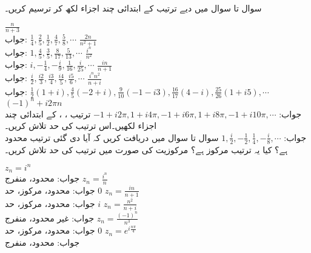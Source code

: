 سوال  تا سوال  میں دیے ترتیب کے ابتدائی چند اجزاء لکھ کر ترسیم کریں۔

\quad
$\tfrac{n}{n+3}$\\
جواب:\quad
$\tfrac{1}{4},\tfrac{2}{5},\tfrac{1}{2},\tfrac{4}{7},\tfrac{5}{8},\cdots$
\quad
$\tfrac{2n}{n^2+1}$\\
جواب:\quad
$1,\tfrac{4}{5},\tfrac{3}{5},\tfrac{8}{17},\tfrac{5}{13},\cdots$
\quad
$\tfrac{i^n}{n^2}$\\
جواب:\quad
$i,-\tfrac{1}{4},-\tfrac{i}{9},\tfrac{1}{16},\tfrac{i}{25},\cdots$
\quad
$\tfrac{in}{n+1}$\\
جواب:\quad
$\tfrac{i}{2},\tfrac{i2}{3},\tfrac{i3}{4},\tfrac{i4}{5},\tfrac{i5}{6},\cdots$
\quad
$\tfrac{i^n n^2}{n+i}$\\
جواب:\quad
$\tfrac{1}{2}(1+i),\tfrac{4}{5}(-2+i),\tfrac{9}{10}(-1-i3),\tfrac{16}{17}(4-i),\tfrac{25}{26}(1+i5),\cdots$
\quad
$(-1)^n+i2\pi n$\\
جواب:\quad
$-1+i2\pi, 1+i4\pi,-1+i6\pi, 1+i8\pi, -1+i10\pi,\cdots$
\quad
ترتیب ، ،  کے ابتدائی چند اجزاء لکھیں۔اس ترتیب  کی حد تلاش کریں۔\\
جواب:\quad
$1,\tfrac{i}{2}, -\tfrac{1}{2},\tfrac{1}{4}, -\tfrac{i}{8},\cdots$
سوال  تا سوال  میں دریافت کریں کہ آیا دی گئی ترتیب محدود ہے؟ کیا یہ ترتیب مرکوز ہے؟ مرکوزیت کی صورت میں ترتیب کی حد تلاش کریں۔
  
\quad
$z_n=i^n$\\
جواب:\quad
محدود، منفرج
\quad
$z_n=\tfrac{i^n}{n}$\\
جواب:\quad
محدود، مرکوز، حد $0$
\quad
$z_n=\tfrac{in}{n+1}$\\
جواب:\quad
محدود، مرکوز، حد $i$
\quad
$z_n=\tfrac{n^2}{n+i}$\\
جواب:\quad
غیر محدود، منفرج
\quad
$z_n=\tfrac{(-1)^n}{n^3}$\\
جواب:\quad
محدود، مرکوز، حد $0$
\quad
$z_n=e^{i\tfrac{n\pi}{4}}$\\
جواب:\quad
محدود، منفرج
